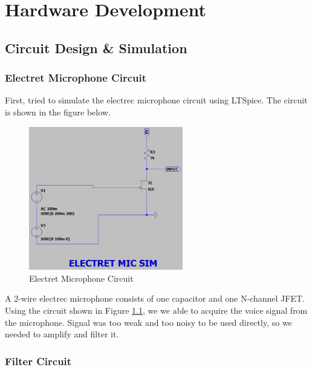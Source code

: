 \chapter{Hardware Development}

\section{Circuit Design \& Simulation}

\subsection{Electret Microphone Circuit}
First, tried to simulate the electrec microphone circuit using LTSpice. The circuit is shown in the figure below.

\begin{figure}[h]
    \centering
    \includegraphics[width=0.6\textwidth]{assets/mic_circuit.png}
    \caption{Electret Microphone Circuit}
    \label{fig:mic_circuit}
\end{figure}

A 2-wire electrec microphone consists of one capacitor and one N-channel JFET. Using the circuit shown in Figure \ref{fig:mic_circuit}, we we able to acquire the voice signal from the microphone. Signal was too weak and too noisy to be used directly, so we needed to amplify and filter it.

\newpage
\thispagestyle{plain}

\subsection{Filter Circuit}

